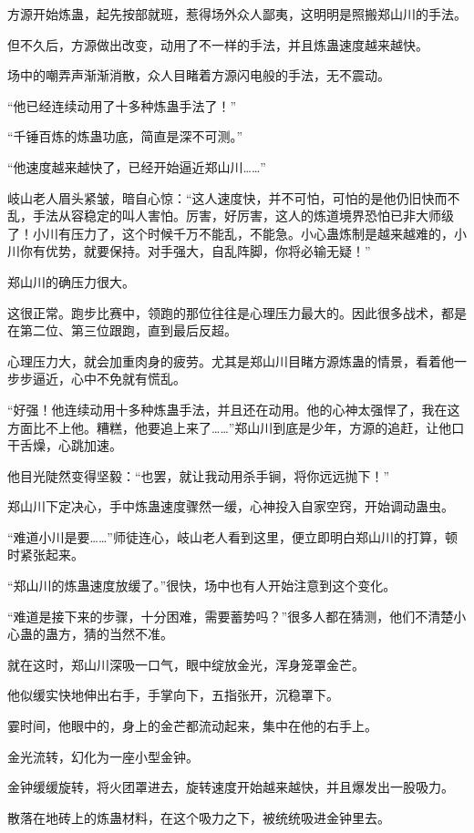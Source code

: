 \begin{this_body}
方源开始炼蛊，起先按部就班，惹得场外众人鄙夷，这明明是照搬郑山川的手法。

但不久后，方源做出改变，动用了不一样的手法，并且炼蛊速度越来越快。

场中的嘲弄声渐渐消散，众人目睹着方源闪电般的手法，无不震动。

“他已经连续动用了十多种炼蛊手法了！”

“千锤百炼的炼蛊功底，简直是深不可测。”

“他速度越来越快了，已经开始逼近郑山川……”

岐山老人眉头紧皱，暗自心惊：“这人速度快，并不可怕，可怕的是他仍旧快而不乱，手法从容稳定的叫人害怕。厉害，好厉害，这人的炼道境界恐怕已非大师级了！小川有压力了，这个时候千万不能乱，不能急。小心蛊炼制是越来越难的，小川你有优势，就要保持。对手强大，自乱阵脚，你将必输无疑！”

郑山川的确压力很大。

这很正常。跑步比赛中，领跑的那位往往是心理压力最大的。因此很多战术，都是在第二位、第三位跟跑，直到最后反超。

心理压力大，就会加重肉身的疲劳。尤其是郑山川目睹方源炼蛊的情景，看着他一步步逼近，心中不免就有慌乱。

“好强！他连续动用十多种炼蛊手法，并且还在动用。他的心神太强悍了，我在这方面比不上他。糟糕，他要追上来了……”郑山川到底是少年，方源的追赶，让他口干舌燥，心跳加速。

他目光陡然变得坚毅：“也罢，就让我动用杀手锏，将你远远抛下！”

郑山川下定决心，手中炼蛊速度骤然一缓，心神投入自家空窍，开始调动蛊虫。

“难道小川是要……”师徒连心，岐山老人看到这里，便立即明白郑山川的打算，顿时紧张起来。

“郑山川的炼蛊速度放缓了。”很快，场中也有人开始注意到这个变化。

“难道是接下来的步骤，十分困难，需要蓄势吗？”很多人都在猜测，他们不清楚小心蛊的蛊方，猜的当然不准。

就在这时，郑山川深吸一口气，眼中绽放金光，浑身笼罩金芒。

他似缓实快地伸出右手，手掌向下，五指张开，沉稳罩下。

霎时间，他眼中的，身上的金芒都流动起来，集中在他的右手上。

金光流转，幻化为一座小型金钟。

金钟缓缓旋转，将火团罩进去，旋转速度开始越来越快，并且爆发出一股吸力。

散落在地砖上的炼蛊材料，在这个吸力之下，被统统吸进金钟里去。


\end{this_body}

